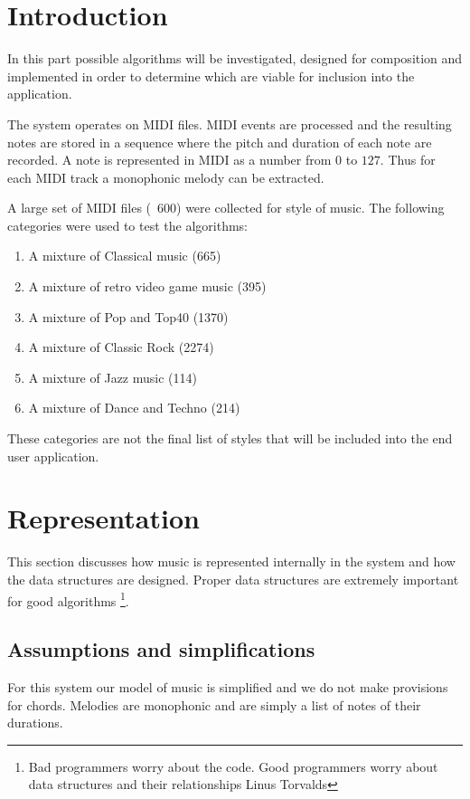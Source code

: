 

\chapter{Introduction}
In this part possible algorithms will be investigated, designed for composition and implemented in order to determine which are viable for inclusion into the application.

The system operates on MIDI files. MIDI events are processed and the resulting notes are stored in a sequence where the pitch and duration of each note are recorded. A note is represented in MIDI as a number from $0$ to $127$.
Thus for each MIDI track a monophonic melody can be extracted.

A large set of MIDI files (~600) were collected for style of music. The following categories were used to test the algorithms:
\begin{enumerate}
\item A mixture of Classical music (665)
\item A mixture of retro video game music (395)
\item A mixture of Pop and Top40 (1370)
\item A mixture of Classic Rock (2274)
\item A mixture of Jazz music (114)
\item A mixture of Dance and Techno (214)
\end{enumerate}

These categories are not the final list of styles that will be included into the end user application.


\chapter{Representation}
This section discusses how music is represented internally in the system and how the data structures are designed. 
Proper data structures are extremely important for good algorithms \footnote{Bad programmers worry about the code. Good programmers worry about data structures and their relationships \mytilde Linus Torvalds}.

\section{Assumptions and simplifications}
For this system our model of music is simplified and we do not make provisions for chords. Melodies are monophonic and are simply a list of notes of their durations.

